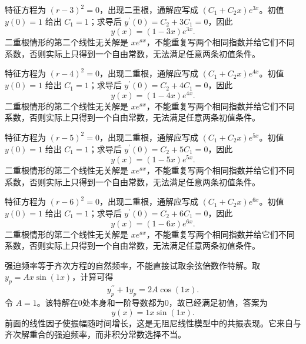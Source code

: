 \documentclass[12pt,fontset=fandol]{ctexart}
\begin{document}
\begin{solve}\label{ans:c23q15}
特征方程为 $(r-3)^2=0$，出现二重根，通解应写成 $(C_1+C_2x)e^{3x}$。初值 $y(0)=1$ 给出 $C_1=1$；求导后 $y^{\prime}(0)=C_2+3C_1=0$，因此
\[
y(x)=(1-3x)e^{3x}.
\]
二重根情形的第二个线性无关解是 $xe^{ax}$，不能重复写两个相同指数并给它们不同系数，否则实际上只得到一个自由常数，无法满足任意两条初值条件。
\end{solve}

\begin{solve}\label{ans:c23q16}
特征方程为 $(r-4)^2=0$，出现二重根，通解应写成 $(C_1+C_2x)e^{4x}$。初值 $y(0)=1$ 给出 $C_1=1$；求导后 $y^{\prime}(0)=C_2+4C_1=0$，因此
\[
y(x)=(1-4x)e^{4x}.
\]
二重根情形的第二个线性无关解是 $xe^{ax}$，不能重复写两个相同指数并给它们不同系数，否则实际上只得到一个自由常数，无法满足任意两条初值条件。
\end{solve}

\begin{solve}\label{ans:c23q17}
特征方程为 $(r-5)^2=0$，出现二重根，通解应写成 $(C_1+C_2x)e^{5x}$。初值 $y(0)=1$ 给出 $C_1=1$；求导后 $y^{\prime}(0)=C_2+5C_1=0$，因此
\[
y(x)=(1-5x)e^{5x}.
\]
二重根情形的第二个线性无关解是 $xe^{ax}$，不能重复写两个相同指数并给它们不同系数，否则实际上只得到一个自由常数，无法满足任意两条初值条件。
\end{solve}

\begin{solve}\label{ans:c23q18}
特征方程为 $(r-6)^2=0$，出现二重根，通解应写成 $(C_1+C_2x)e^{6x}$。初值 $y(0)=1$ 给出 $C_1=1$；求导后 $y^{\prime}(0)=C_2+6C_1=0$，因此
\[
y(x)=(1-6x)e^{6x}.
\]
二重根情形的第二个线性无关解是 $xe^{ax}$，不能重复写两个相同指数并给它们不同系数，否则实际上只得到一个自由常数，无法满足任意两条初值条件。
\end{solve}

\begin{solve}\label{ans:c23q19}
强迫频率等于齐次方程的自然频率，不能直接试取余弦倍数作特解。取 $y_p=A x\sin(1x)$，计算可得
\[
y_p^{\prime\prime}+1y_p=2A\cos(1x).
\]
令 $A=1$。该特解在0处本身和一阶导数都为0，故已经满足初值，答案为
\[
y(x)=1x\sin(1x).
\]
前面的线性因子使振幅随时间增长，这是无阻尼线性模型中的共振表现。它来自与齐次解重合的强迫频率，而非积分常数选择不当。
\end{solve}
\end{document}
